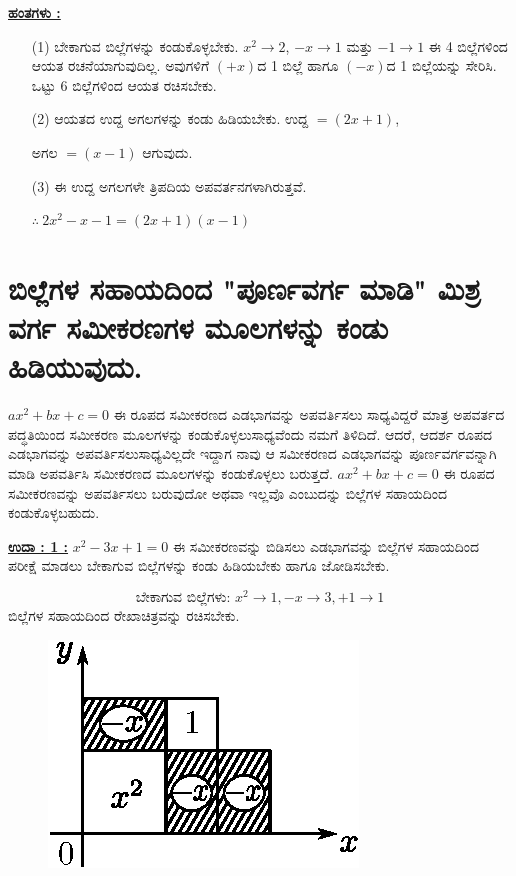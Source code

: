 \noindent
{\textbf{\underline{ಹಂತಗಳು :}}}
\begin{itemize}
\item [(1)] ಬೇಕಾಗುವ ಬಿಲ್ಲೆಗಳನ್ನು ಕಂಡುಕೊಳ್ಳಬೇಕು. $x^2 \rightarrow 2$, $-x \rightarrow 1$ ಮತ್ತು $-1 \rightarrow 1$ ಈ 4 ಬಿಲ್ಲೆಗಳಿಂದ ಆಯತ ರಚನೆಯಾಗುವುದಿಲ್ಲ. ಅವುಗಳಿಗೆ $(+x)$ದ 1 ಬಿಲ್ಲೆ ಹಾಗೂ $(-x)$ದ 1 ಬಿಲ್ಲೆಯನ್ನು ಸೇರಿಸಿ. ಒಟ್ಟು 6 ಬಿಲ್ಲೆಗಳಿಂದ ಆಯತ ರಚಿಸಬೇಕು. 
\item [(2)] ಆಯತದ ಉದ್ದ ಅಗಲಗಳನ್ನು ಕಂಡು ಹಿಡಿಯಬೇಕು. ಉದ್ದ $= (2x + 1)$, 

ಅಗಲ $= (x - 1)$ ಆಗುವುದು. 

\item [(3)] ಈ ಉದ್ದ ಅಗಲಗಳೇ ತ್ರಿಪದಿಯ ಅಪವರ್ತನಗಳಾಗಿರುತ್ತವೆ. 

$\therefore~ 2x^2 - x - 1 = (2x + 1)(x - 1)$
\end{itemize}


\section{ಬಿಲ್ಲೆಗಳ ಸಹಾಯದಿಂದ "ಪೂರ್ಣವರ್ಗ ಮಾಡಿ" ಮಿಶ್ರ ವರ್ಗ ಸಮೀಕರಣಗಳ ಮೂಲಗಳನ್ನು ಕಂಡು ಹಿಡಿಯುವುದು.}\label{sec3.10}%

$ax^2 + bx + c = 0$ ಈ ರೂಪದ ಸಮೀಕರಣದ ಎಡಭಾಗವನ್ನು ಅಪವರ್ತಿಸಲು ಸಾಧ್ಯ\break ವಿದ್ದರೆ ಮಾತ್ರ ಅಪವರ್ತದ ಪದ್ಧತಿಯಿಂದ ಸಮೀಕರಣ ಮೂಲಗಳನ್ನು ಕಂಡುಕೊಳ್ಳಲು\break ಸಾಧ್ಯವೆಂದು ನಮಗೆ ತಿಳಿದಿದೆ. ಆದರೆ, ಆದರ್ಶ ರೂಪದ ಎಡಭಾಗವನ್ನು ಅಪವರ್ತಿಸಲು\break ಸಾಧ್ಯವಿಲ್ಲದೇ ಇದ್ದಾಗ ನಾವು ಆ ಸಮೀಕರಣದ ಎಡಭಾಗವನ್ನು ಪೂರ್ಣವರ್ಗವನ್ನಾಗಿ ಮಾಡಿ ಅಪವರ್ತಿಸಿ ಸಮೀಕರಣದ ಮೂಲಗಳನ್ನು ಕಂಡುಕೊಳ್ಳಲು ಬರುತ್ತದೆ. $ax^2 + bx + c = 0$ ಈ ರೂಪದ ಸಮೀಕರಣವನ್ನು ಅಪವರ್ತಿಸಲು ಬರುವುದೋ ಅಥವಾ ಇಲ್ಲವೊ ಎಂಬುದನ್ನು ಬಿಲ್ಲೆಗಳ ಸಹಾಯದಿಂದ ಕಂಡುಕೊಳ್ಳಬಹುದು. 

\noindent
{\textbf{\underline{ಉದಾ : 1 :}}} $x^2 - 3x + 1 = 0$ ಈ ಸಮೀಕರಣವನ್ನು ಬಿಡಿಸಲು ಎಡಭಾಗವನ್ನು ಬಿಲ್ಲೆಗಳ ಸಹಾಯದಿಂದ ಪರೀಕ್ಷೆ ಮಾಡಲು ಬೇಕಾಗುವ ಬಿಲ್ಲೆಗಳನ್ನು ಕಂಡು ಹಿಡಿಯಬೇಕು ಹಾಗೂ ಜೋಡಿಸಬೇಕು. 

\vfill\eject
$$
\text{ಬೇಕಾಗುವ ಬಿಲ್ಲೆಗಳು: } x^2 \rightarrow 1, -x \rightarrow 3, +1 \rightarrow 1
$$
ಬಿಲ್ಲೆಗಳ ಸಹಾಯದಿಂದ ರೇಖಾಚಿತ್ರವನ್ನು ರಚಿಸಬೇಕು.
\begin{figure}[H]
\centering
\includegraphics[scale=0.8]{src/figure/chap3/fig3-47.eps}
\end{figure}

